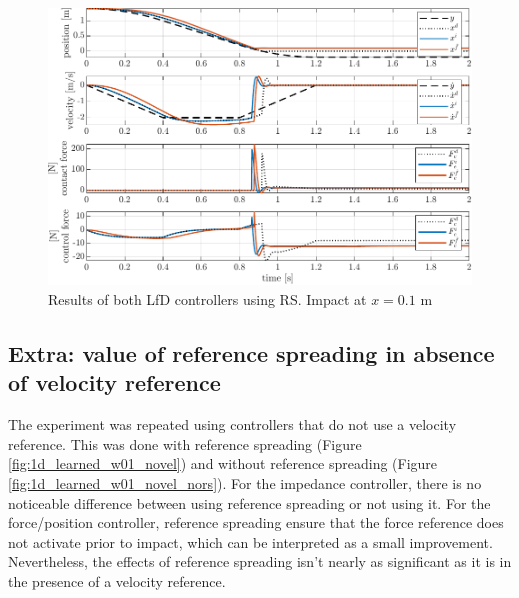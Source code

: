 \documentclass[11pt]{report}
\numberwithin{equation}{section}        %
\numberwithin{figure}{section}          %
\numberwithin{table}{section}           %
\begin{document}
  \begin{figure}[!h]
  \centering
  \begin{adjustwidth}{0pt}{5pt}
  \includegraphics[right]{Graphics/1d_learned_w=0.1.pdf}
  \end{adjustwidth}
  \caption{Results of both LfD controllers using RS. Impact at $x=0.1$ m}
  \label{fig:1d_learned_w01}
  \end{figure}
\newpage
  \subsection{Extra: value of reference spreading in absence of velocity reference}
  The experiment was repeated using controllers that do not use a velocity reference. This was done with reference spreading (Figure \ref{fig:1d_learned_w01_novel}) and without reference spreading (Figure \ref{fig:1d_learned_w01_novel_nors}). For the impedance controller, there is no noticeable difference between using reference spreading or not using it. For the force/position controller, reference spreading ensure that the force reference does not activate prior to impact, which can be interpreted as a small improvement. Nevertheless, the effects of reference spreading isn't nearly as significant as it is in the presence of a velocity reference.
\end{document}
